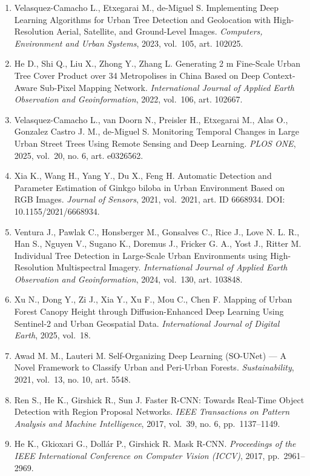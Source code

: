 \begin{enumerate}
\item
  Velasquez-Camacho L., Etxegarai M., de-Miguel S. Implementing Deep Learning Algorithms for Urban Tree Detection and Geolocation with High-Resolution Aerial, Satellite, and Ground-Level Images. \emph{Computers, Environment and Urban Systems}, 2023, vol.~105, art. 102025.
\item
  He D., Shi Q., Liu X., Zhong Y., Zhang L. Generating 2 m Fine-Scale Urban Tree Cover Product over 34 Metropolises in China Based on Deep Context-Aware Sub-Pixel Mapping Network. \emph{International Journal of Applied Earth Observation and Geoinformation}, 2022, vol.~106, art. 102667.
\item
  Velasquez-Camacho L., van Doorn N., Preisler H., Etxegarai M., Alas O., Gonzalez Castro J. M., de-Miguel S. Monitoring Temporal Changes in Large Urban Street Trees Using Remote Sensing and Deep Learning. \emph{PLOS ONE}, 2025, vol.~20, no. 6, art. e0326562.
\item
  Xia K., Wang H., Yang Y., Du X., Feng H. Automatic Detection and Parameter Estimation of Ginkgo biloba in Urban Environment Based on RGB Images. \emph{Journal of Sensors}, 2021, vol.~2021, art. ID 6668934. DOI: 10.1155/2021/6668934.
\item
  Ventura J., Pawlak C., Honsberger M., Gonsalves C., Rice J., Love N. L. R., Han S., Nguyen V., Sugano K., Doremus J., Fricker G. A., Yost J., Ritter M. Individual Tree Detection in Large-Scale Urban Environments using High-Resolution Multispectral Imagery. \emph{International Journal of Applied Earth Observation and Geoinformation}, 2024, vol.~130, art. 103848.
\item
  Xu N., Dong Y., Zi J., Xia Y., Xu F., Mou C., Chen F. Mapping of Urban Forest Canopy Height through Diffusion-Enhanced Deep Learning Using Sentinel-2 and Urban Geospatial Data. \emph{International Journal of Digital Earth}, 2025, vol.~18.
\item
  Awad M. M., Lauteri M. Self-Organizing Deep Learning (SO-UNet) --- A Novel Framework to Classify Urban and Peri-Urban Forests. \emph{Sustainability}, 2021, vol.~13, no. 10, art. 5548.
\item
  Ren S., He K., Girshick R., Sun J. Faster R-CNN: Towards Real-Time Object Detection with Region Proposal Networks. \emph{IEEE Transactions on Pattern Analysis and Machine Intelligence}, 2017, vol.~39, no. 6, pp.~1137--1149.
\item
  He K., Gkioxari G., Dollár P., Girshick R. Mask R-CNN. \emph{Proceedings of the IEEE International Conference on Computer Vision (ICCV)}, 2017, pp.~2961--2969.

\end{enumerate}
